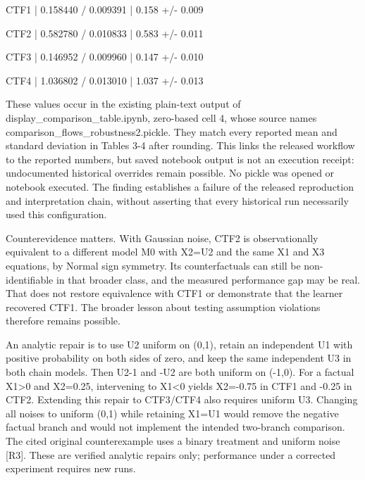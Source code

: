 \documentclass[10pt]{article}
\begin{document}
CTF1 | 0.158440 / 0.009391 | 0.158 +/- 0.009\par
CTF2 | 0.582780 / 0.010833 | 0.583 +/- 0.011\par
CTF3 | 0.146952 / 0.009960 | 0.147 +/- 0.010\par
CTF4 | 1.036802 / 0.013010 | 1.037 +/- 0.013\par
These values occur in the existing plain-text output of display\_comparison\_table.ipynb, zero-based cell 4, whose source names comparison\_flows\_robustness2.pickle. They match every reported mean and standard deviation in Tables 3-4 after rounding. This links the released workflow to the reported numbers, but saved notebook output is not an execution receipt: undocumented historical overrides remain possible. No pickle was opened or notebook executed. The finding establishes a failure of the released reproduction and interpretation chain, without asserting that every historical run necessarily used this configuration.\par
Counterevidence matters. With Gaussian noise, CTF2 is observationally equivalent to a different model M0 with X2=U2 and the same X1 and X3 equations, by Normal sign symmetry. Its counterfactuals can still be non-identifiable in that broader class, and the measured performance gap may be real. That does not restore equivalence with CTF1 or demonstrate that the learner recovered CTF1. The broader lesson about testing assumption violations therefore remains possible.\par
An analytic repair is to use U2 uniform on (0,1), retain an independent U1 with positive probability on both sides of zero, and keep the same independent U3 in both chain models. Then U2-1 and -U2 are both uniform on (-1,0). For a factual X1>0 and X2=0.25, intervening to X1<0 yields X2=-0.75 in CTF1 and -0.25 in CTF2. Extending this repair to CTF3/CTF4 also requires uniform U3. Changing all noises to uniform (0,1) while retaining X1=U1 would remove the negative factual branch and would not implement the intended two-branch comparison. The cited original counterexample uses a binary treatment and uniform noise [R3]. These are verified analytic repairs only; performance under a corrected experiment requires new runs.\par
\end{document}
